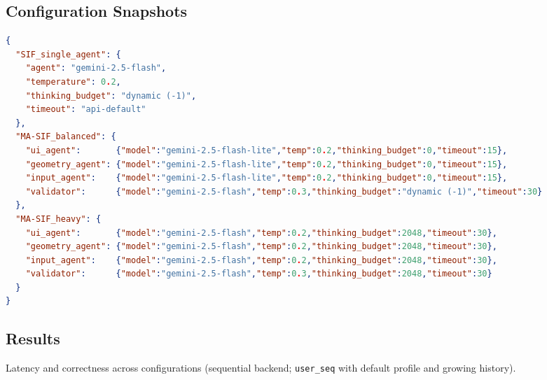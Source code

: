 \documentclass[openany]{book}
\begin{document}
\subsection*{Configuration Snapshots}
\begin{lstlisting}[language=json,caption={Exact settings used in the three measured configurations.}]
{
  "SIF_single_agent": {
    "agent": "gemini-2.5-flash",
    "temperature": 0.2,
    "thinking_budget": "dynamic (-1)",
    "timeout": "api-default"
  },
  "MA-SIF_balanced": {
    "ui_agent":       {"model":"gemini-2.5-flash-lite","temp":0.2,"thinking_budget":0,"timeout":15},
    "geometry_agent": {"model":"gemini-2.5-flash-lite","temp":0.2,"thinking_budget":0,"timeout":15},
    "input_agent":    {"model":"gemini-2.5-flash-lite","temp":0.2,"thinking_budget":0,"timeout":15},
    "validator":      {"model":"gemini-2.5-flash","temp":0.3,"thinking_budget":"dynamic (-1)","timeout":30}
  },
  "MA-SIF_heavy": {
    "ui_agent":       {"model":"gemini-2.5-flash","temp":0.2,"thinking_budget":2048,"timeout":30},
    "geometry_agent": {"model":"gemini-2.5-flash","temp":0.2,"thinking_budget":2048,"timeout":30},
    "input_agent":    {"model":"gemini-2.5-flash","temp":0.2,"thinking_budget":2048,"timeout":30},
    "validator":      {"model":"gemini-2.5-flash","temp":0.3,"thinking_budget":2048,"timeout":30}
  }
}
\end{lstlisting}

\subsection*{Results}
\begin{table}[h]
\centering
\caption{Latency and correctness across configurations (sequential backend; \texttt{user\_seq} with default profile and growing history).}
\setlength{\tabcolsep}{4pt}
\small
{}
\caption*{\textit{Legend.} WS p50/p90/max: WebSocket round-trip latency percentiles and maximum (ms). Suite p50/p90/max: end-to-end latency percentiles and maximum for the deterministic event suite (ms). Schema-valid: share of responses that passed JSON schema validation (\%). \textit{n}: number of events.}
\end{table}
\end{document}
